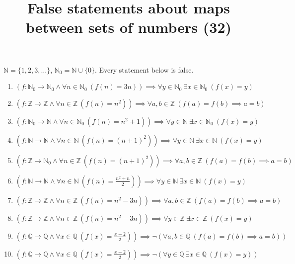 \documentclass[11pt,a4paper]{article}
\title{False statements about maps between sets of numbers (32)}
\author{}
\date{}
\begin{document}
\maketitle
$\mathbb{N} = \{1, 2, 3, \ldots\}$, $\mathbb{N}_{0} = \mathbb{N} \cup \{0\}$. Every statement below is false.

\begin{enumerate}
\item $\displaystyle (f \colon \mathbb{N}_{0} \to \mathbb{N}_{0} \land \forall n \in \mathbb{N}_{0}\ (f(n) = 3n)) \implies \forall y \in \mathbb{N}_{0}\ \exists x \in \mathbb{N}_{0}\ (f(x) = y)$
\item $\displaystyle (f \colon \mathbb{Z} \to \mathbb{Z} \land \forall n \in \mathbb{Z}\ (f(n) = n^{2})) \implies \forall a, b \in \mathbb{Z}\ (f(a) = f(b) \implies a = b)$
\item $\displaystyle (f \colon \mathbb{N}_{0} \to \mathbb{N} \land \forall n \in \mathbb{N}_{0}\ (f(n) = n^{2} + 1)) \implies \forall y \in \mathbb{N}\ \exists x \in \mathbb{N}_{0}\ (f(x) = y)$
\item $\displaystyle (f \colon \mathbb{N} \to \mathbb{N} \land \forall n \in \mathbb{N}\ (f(n) = (n + 1)^{2})) \implies \forall y \in \mathbb{N}\ \exists x \in \mathbb{N}\ (f(x) = y)$
\item $\displaystyle (f \colon \mathbb{Z} \to \mathbb{N}_{0} \land \forall n \in \mathbb{Z}\ (f(n) = (n + 1)^{2})) \implies \forall a, b \in \mathbb{Z}\ (f(a) = f(b) \implies a = b)$
\item $\displaystyle (f \colon \mathbb{N} \to \mathbb{N} \land \forall n \in \mathbb{N}\ (f(n) = \frac{n^{2} + n}{2})) \implies \forall y \in \mathbb{N}\ \exists x \in \mathbb{N}\ (f(x) = y)$
\item $\displaystyle (f \colon \mathbb{Z} \to \mathbb{Z} \land \forall n \in \mathbb{Z}\ (f(n) = n^{2} - 3n)) \implies \forall a, b \in \mathbb{Z}\ (f(a) = f(b) \implies a = b)$
\item $\displaystyle (f \colon \mathbb{Z} \to \mathbb{Z} \land \forall n \in \mathbb{Z}\ (f(n) = n^{2} - 3n)) \implies \forall y \in \mathbb{Z}\ \exists x \in \mathbb{Z}\ (f(x) = y)$
\item $\displaystyle (f \colon \mathbb{Q} \to \mathbb{Q} \land \forall x \in \mathbb{Q}\ (f(x) = \frac{x - 2}{2})) \implies \lnot (\forall a, b \in \mathbb{Q}\ (f(a) = f(b) \implies a = b))$
\item $\displaystyle (f \colon \mathbb{Q} \to \mathbb{Q} \land \forall x \in \mathbb{Q}\ (f(x) = \frac{x - 2}{2})) \implies \lnot (\forall y \in \mathbb{Q}\ \exists x \in \mathbb{Q}\ (f(x) = y))$

\end{enumerate}
\end{document}
